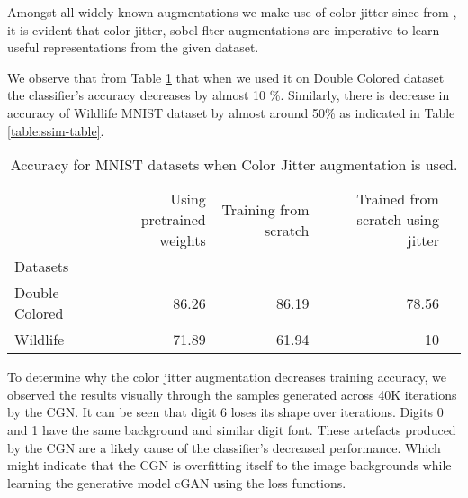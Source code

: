 \begin{appendices}
Amongst all widely known augmentations we make use of color jitter since from \cite{chen2020simple}, \cite{he2020momentum} it is evident that color jitter, sobel flter augmentations are imperative to learn useful representations from the given dataset. 

We observe that from Table \ref{table:colorjitter-table} that when we used it on Double Colored dataset the classifier's accuracy decreases by almost 10 \%. Similarly, there is decrease in accuracy of Wildlife MNIST dataset by almost around 50\% as indicated in Table \ref{table:ssim-table}. 


 


\begin{table}[h]
\centering
\begin{tabular}{lrrrr}
\toprule
{} & Using pretrained weights &  Training from scratch & Trained from scratch using jitter\\
Datasets  &              &              &                            \\
\midrule
Double Colored              &        86.26  &        86.19 &         78.56  \\
Wildlife              &        71.89 &        61.94 &         10  \\
\bottomrule
\end{tabular}
\caption{Accuracy for MNIST datasets when Color Jitter augmentation is used.   }
\label{table:colorjitter-table}
\end{table}


To determine why the color jitter augmentation decreases training accuracy, we observed the results visually through the samples generated across 40K iterations by the CGN. 
  It can be seen that digit 6 loses its shape over iterations. Digits 0 and 1 have the same background and similar digit font. These artefacts produced by the CGN\cite{sauer2021counterfactual} are a likely cause of the classifier's decreased performance. Which might indicate that the CGN is overfitting itself to the image backgrounds while learning the generative model cGAN using the loss functions. 


\end{appendices}
